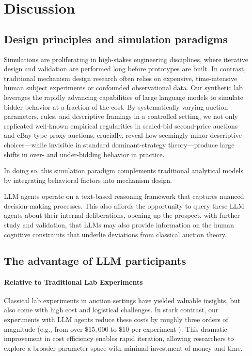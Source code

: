 
\section{Discussion}\label{sec:discussion}



\subsection{Design principles and simulation paradigms}

Simulations are proliferating in high-stakes engineering disciplines, where iterative design and validation are performed long before prototypes are built. 
In contrast, traditional mechanism design research often relies on expensive, time-intensive human subject experiments or confounded observational data. 
Our synthetic lab leverages the rapidly advancing capabilities of large language models to simulate bidder behavior at a fraction of the cost. 
By systematically varying auction parameters, rules, and descriptive framings in a controlled setting, we not only replicated well-known empirical regularities in sealed-bid second-price auctions and eBay-type proxy auctions, crucially, reveal how seemingly minor descriptive choices—while invisible in standard dominant-strategy theory—produce large shifts in over- and under-bidding behavior in practice.


In doing so, this
simulation paradigm complements traditional analytical models by integrating behavioral factors into mechanism design.

LLM agents operate on a text-based reasoning framework that captures nuanced decision-making processes. 
This also affords  the opportunity to query these  LLM agents about their internal deliberations, opening up the prospect, with further study and validation, that LLMs may also provide information on the human cognitive constraints that  underlie deviations from classical auction theory. 


\subsection{The advantage of LLM participants}
\paragraph{Relative to Traditional Lab Experiments}
Classical lab experiments in auction settings have yielded valuable insights, 
but also come with high cost and logistical challenges.
In stark contrast, our experiments with LLM agents reduce these costs by roughly three orders of magnitude (e.g., from over $\$15{,}000$ to  $\$10$ per experiment \citep{li2017obviously}). 
%
This dramatic improvement in cost efficiency enables rapid iteration, allowing researchers to explore a broader parameter space with minimal investment of money and time. 

